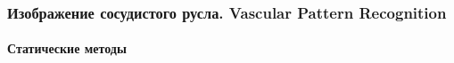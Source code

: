 \begin{frame}[allowframebreaks]
\frametitle{Изображение сосудистого русла. Vascular Pattern Recognition}
\framesubtitle{Статические методы}

\begin{figure}
    \begin{center}
    \end{center}
\end{figure} 


\end{frame}
